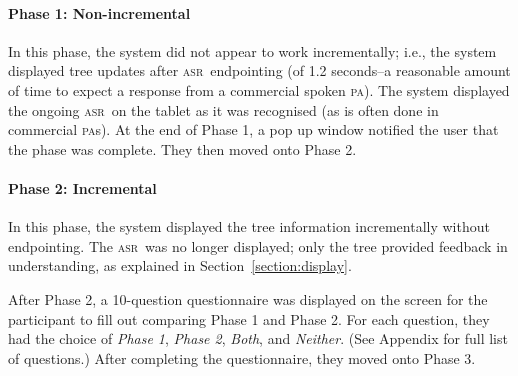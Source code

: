 \documentclass[11pt]{article}
\newcommand{\asr}[0]{\textsc{asr}}
\newcommand{\pa}[0]{\textsc{pa}}
\begin{document}
\paragraph{Phase 1: Non-incremental} In this phase, the system did not appear to work incrementally; i.e., the system displayed tree updates after \asr\ endpointing (of 1.2 seconds--a reasonable amount of time to expect a response from a commercial spoken \pa). The system displayed the ongoing \asr\ on the tablet as it was recognised (as is often done in commercial \pa s). At the end of Phase 1, a pop up window notified the user that the phase was complete. They then moved onto Phase 2.

\paragraph{Phase 2: Incremental} In this phase, the system displayed the tree information incrementally without endpointing. The \asr\ was no longer displayed; only the tree provided feedback in understanding, as explained in Section~\ref{section:display}. 

After Phase 2, a 10-question questionnaire was displayed on the screen for the participant to fill out comparing Phase 1 and Phase 2. For each question, they had the choice of \emph{Phase 1}, \emph{Phase 2}, \emph{Both}, and \emph{Neither}. (See Appendix for full list of questions.) After completing the questionnaire, they moved onto Phase 3.
\end{document}
